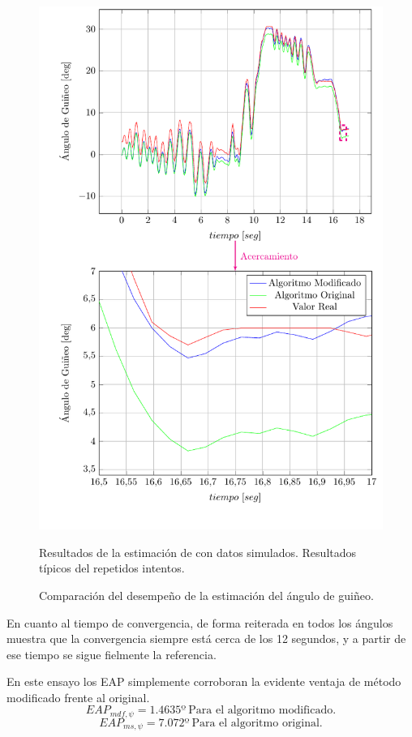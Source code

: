 \documentclass[10pt]{report}
\numberwithin{equation}{chapter}
\numberwithin{algorithm}{chapter}
\begin{document}
\begin{figure}
\begin{center}
\includegraphics{PlotPs11.pdf}
\caption{Comparación del desempeño de la estimación del ángulo de guiñeo.}
\scriptsize{Resultados de la estimación de con datos simulados. Resultados típicos del repetidos intentos.}
\label{PlotPs1}
\end{center}
\end{figure}
En cuanto al tiempo de convergencia, de forma reiterada en todos los ángulos muestra que la convergencia siempre está cerca de los 12 segundos, y a partir de ese tiempo se sigue fielmente la referencia.\par
En este ensayo los EAP simplemente corroboran la evidente ventaja de método modificado frente al original.
\begin{equation*}
EAP_{mdf,\psi}=1.4635º~\text{Para el algoritmo modificado.}
\end{equation*}
\begin{equation*}
EAP_{ms,\psi}=7.072º~\text{Para el algoritmo original.}
\end{equation*}\newpage
\end{document}
